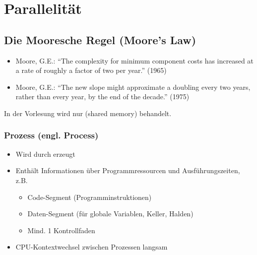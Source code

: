 \section{Parallelität}
\subsection{Die Mooresche Regel (Moore's Law)}
\begin{itemize}
    \item Moore, G.E.:
    “The complexity for minimum component costs has increased at a rate of roughly a factor of two per year.” (1965)
    \item Moore, G.E.:
    “The new slope might approximate a doubling every two years, rather than every year, by the end of the decade.” (1975)
\end{itemize}


In der Vorlesung wird nur  (shared memory) behandelt.

\subsubsection{Prozess (engl. Process)}
\begin{itemize}
    \item Wird durch  erzeugt
    \item Enthält Informationen über Programmressourcen und Ausführungszeiten, z.B. 
    \begin{itemize}
        \item Code-Segment (Programminstruktionen)
        \item Daten-Segment (für globale Variablen, Keller, Halden)
        \item Mind. 1 Kontrollfaden
    \end{itemize}
    \item CPU-Kontextwechsel zwischen Prozessen langsam
\end{itemize}

